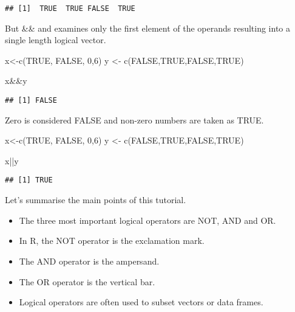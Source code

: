 \documentclass[
]{article}
\newenvironment{Shaded}{\begin{snugshade}}{\end{snugshade}}
\newcommand{\ConstantTok}[1]{\textcolor[rgb]{0.00,0.00,0.00}{#1}}
\newcommand{\DecValTok}[1]{\textcolor[rgb]{0.00,0.00,0.81}{#1}}
\newcommand{\FunctionTok}[1]{\textcolor[rgb]{0.00,0.00,0.00}{#1}}
\newcommand{\NormalTok}[1]{#1}
\newcommand{\OtherTok}[1]{\textcolor[rgb]{0.56,0.35,0.01}{#1}}
\newcommand{\SpecialCharTok}[1]{\textcolor[rgb]{0.00,0.00,0.00}{#1}}
\providecommand{\tightlist}{%
  \setlength{\itemsep}{0pt}\setlength{\parskip}{0pt}}
\begin{document}
\begin{verbatim}
## [1]  TRUE  TRUE FALSE  TRUE
\end{verbatim}

But \&\& and \textbar\textbar{} examines only the first element of the
operands resulting into a single length logical vector.

\begin{Shaded}
\begin{Highlighting}[]
\NormalTok{x}\OtherTok{\textless{}{-}}\FunctionTok{c}\NormalTok{(}\ConstantTok{TRUE}\NormalTok{, }\ConstantTok{FALSE}\NormalTok{, }\DecValTok{0}\NormalTok{,}\DecValTok{6}\NormalTok{)}
\NormalTok{y }\OtherTok{\textless{}{-}} \FunctionTok{c}\NormalTok{(}\ConstantTok{FALSE}\NormalTok{,}\ConstantTok{TRUE}\NormalTok{,}\ConstantTok{FALSE}\NormalTok{,}\ConstantTok{TRUE}\NormalTok{)}

\NormalTok{x}\SpecialCharTok{\&\&}\NormalTok{y}
\end{Highlighting}
\end{Shaded}

\begin{verbatim}
## [1] FALSE
\end{verbatim}

Zero is considered FALSE and non-zero numbers are taken as TRUE.

\begin{Shaded}
\begin{Highlighting}[]
\NormalTok{x}\OtherTok{\textless{}{-}}\FunctionTok{c}\NormalTok{(}\ConstantTok{TRUE}\NormalTok{, }\ConstantTok{FALSE}\NormalTok{, }\DecValTok{0}\NormalTok{,}\DecValTok{6}\NormalTok{)}
\NormalTok{y }\OtherTok{\textless{}{-}} \FunctionTok{c}\NormalTok{(}\ConstantTok{FALSE}\NormalTok{,}\ConstantTok{TRUE}\NormalTok{,}\ConstantTok{FALSE}\NormalTok{,}\ConstantTok{TRUE}\NormalTok{)}

\NormalTok{x}\SpecialCharTok{||}\NormalTok{y}
\end{Highlighting}
\end{Shaded}

\begin{verbatim}
## [1] TRUE
\end{verbatim}

Let's summarise the main points of this tutorial.

\begin{itemize}
\tightlist
\item
  The three most important logical operators are NOT, AND and OR.
\item
  In R, the NOT operator is the exclamation mark.
\item
  The AND operator is the ampersand.
\item
  The OR operator is the vertical bar.
\item
  Logical operators are often used to subset vectors or data frames.
\end{itemize}
\end{document}
